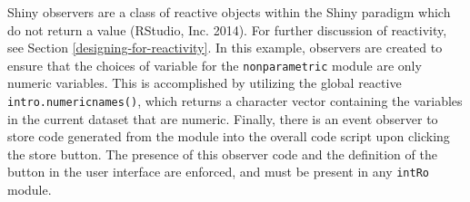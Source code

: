 \documentclass[12pt,]{article}
\newenvironment{Shaded}{\begin{snugshade}}{\end{snugshade}}
\newcommand{\KeywordTok}[1]{\textcolor[rgb]{0.13,0.29,0.53}{\textbf{{#1}}}}
\newcommand{\DataTypeTok}[1]{\textcolor[rgb]{0.13,0.29,0.53}{{#1}}}
\newcommand{\DecValTok}[1]{\textcolor[rgb]{0.00,0.00,0.81}{{#1}}}
\newcommand{\CharTok}[1]{\textcolor[rgb]{0.31,0.60,0.02}{{#1}}}
\newcommand{\StringTok}[1]{\textcolor[rgb]{0.31,0.60,0.02}{{#1}}}
\newcommand{\OtherTok}[1]{\textcolor[rgb]{0.56,0.35,0.01}{{#1}}}
\newcommand{\NormalTok}[1]{{#1}}
\begin{document}
\begin{Shaded}
\end{Shaded}

Shiny observers are a class of reactive objects within the Shiny
paradigm which do not return a value (RStudio, Inc. 2014). For further
discussion of reactivity, see Section \ref{designing-for-reactivity}. In
this example, observers are created to ensure that the choices of
variable for the \texttt{nonparametric} module are only numeric
variables. This is accomplished by utilizing the global reactive
\texttt{intro.numericnames()}, which returns a character vector
containing the variables in the current dataset that are numeric.
Finally, there is an event observer to store code generated from the
module into the overall code script upon clicking the store button. The
presence of this observer code and the definition of the button in the
user interface are enforced, and must be present in any \texttt{intRo}
module.
\end{document}
